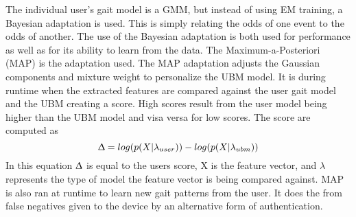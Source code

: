 \documentclass{sig-alternate}
\begin{document}
	The individual user's gait model is a GMM, but instead of using EM training, a Bayesian adaptation is used. This is simply relating the odds of one event to the odds of another. The use of the Bayesian adaptation is both used for performance as well as for its ability to learn from the data. The Maximum-a-Posteriori (MAP) is the adaptation used. The MAP adaptation adjusts the Gaussian components and mixture weight to personalize the UBM model. 
	It is during runtime when the extracted features are compared against the user gait model and the UBM creating a score. High scores result from the user model being higher than the UBM model and visa versa for low scores.  The score are computed as \begin{equation}
	\Updelta = log(p(X|\lambda_{user})) - log(p(X|\lambda_{ubm}))
	\end{equation}
In this equation \begin{math} \Updelta \end{math} is equal to the users score, X is the feature vector, and \begin{math} \lambda \end{math} represents the type of model the feature vector is being compared against. MAP is also ran at runtime to learn new gait patterns from the user. It does the from false negatives given to the device by an alternative form of authentication. 


\end{document}
